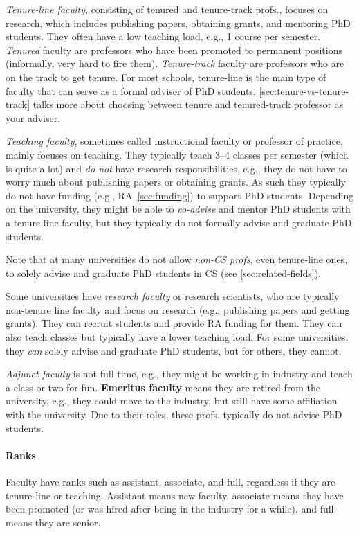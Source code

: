 \documentclass[oneside,11pt,dvipsnames]{book}
\begin{document}
\emph{Tenure-line faculty}, consisting of tenured and tenure-track profs., focuses on research, which includes publishing papers, obtaining grants, and mentoring PhD students.  They often have a low teaching load, e.g., 1 course per semester. \emph{Tenured} faculty are professors who have been promoted to permanent positions (informally, very hard to fire them).  \emph{Tenure-track} faculty are professors who are on the track to get tenure.  For most schools, tenure-line is the main type of faculty that can serve as a formal adviser of PhD students. \autoref{sec:tenure-vs-tenure-track} talks more about choosing between tenure and tenured-track professor as your adviser.

\emph{Teaching faculty}, sometimes called instructional faculty or professor of practice, mainly focuses on teaching. They typically teach 3--4 classes per semester (which is quite a lot) and \emph{do not} have research responsibilities, e.g., they do not have to worry much about publishing papers or obtaining grants. As such they typically do not have funding (e.g., RA~\autoref{sec:funding}) to support PhD students.
Depending on the university, they might be able to \emph{co-advise} and mentor PhD students with a tenure-line faculty, but they typically do not formally advise and graduate PhD students.

Note that at many universities do not allow \emph{non-CS profs}, even tenure-line ones, to solely advise and graduate PhD students in CS (see \autoref{sec:related-fields}). 

Some universities have \emph{research faculty} or research scientists, who are typically non-tenure line faculty and focus on research (e.g., publishing papers and getting grants). 
They can recruit students and provide RA funding for them. 
They can also teach classes but typically have a lower teaching load.
For some universities, they \emph{can} solely advise and graduate PhD students, but for others, they cannot. 

\emph{Adjunct faculty} is not full-time, e.g., they might be working in industry and teach a class or two for fun. \textbf{Emeritus faculty} means they are retired from the university, e.g., they could move to the industry, but still have some affiliation with the university.   Due to their roles, these profs. typically do not advise PhD students.


\paragraph{Ranks} Faculty have ranks such as assistant, associate, and full, regardless if they are tenure-line or teaching.  Assistant means new faculty, associate means they have been promoted (or was hired after being in the industry for a while), and full means they are senior. 
\end{document}
